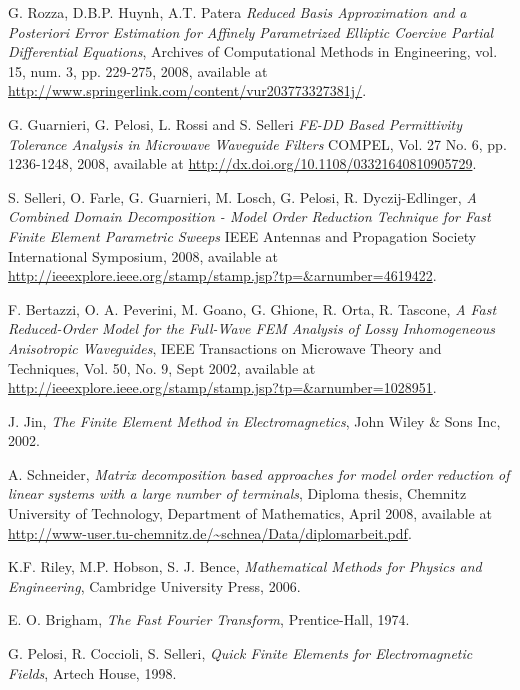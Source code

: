 \begin{thebibliography}{99}
 G. Rozza, D.B.P. Huynh, A.T. Patera \emph{ Reduced Basis Approximation and a Posteriori Error Estimation for Affinely Parametrized Elliptic Coercive Partial Differential Equations}, Archives of Computational Methods in Engineering, vol. 15, num. 3, pp. 229-275, 2008, available at \url{http://www.springerlink.com/content/vur203773327381j/}.

 G. Guarnieri, G. Pelosi, L. Rossi and S. Selleri \emph{FE-DD Based Permittivity Tolerance Analysis in Microwave Waveguide Filters} COMPEL, Vol. 27 No. 6, pp. 1236-1248, 2008, available at \url{http://dx.doi.org/10.1108/03321640810905729}.

 S. Selleri, O. Farle, G. Guarnieri, M. Losch, G. Pelosi,  R. Dyczij-Edlinger, \emph{A Combined Domain Decomposition - Model Order Reduction Technique for Fast Finite Element Parametric Sweeps} IEEE Antennas and Propagation Society International Symposium, 2008, available at \url{http://ieeexplore.ieee.org/stamp/stamp.jsp?tp=&arnumber=4619422}.

 F. Bertazzi, O. A. Peverini, M. Goano, G. Ghione, R. Orta, R. Tascone, \emph{A Fast Reduced-Order Model for the Full-Wave FEM Analysis of Lossy Inhomogeneous Anisotropic Waveguides}, IEEE Transactions on Microwave Theory and Techniques, Vol. 50, No. 9, Sept 2002, available at \url{http://ieeexplore.ieee.org/stamp/stamp.jsp?tp=&arnumber=1028951}.


 J. Jin, \emph{The Finite Element Method in Electromagnetics}, John Wiley \& Sons Inc, 2002.

 A. Schneider, \emph{Matrix decomposition based approaches for model order reduction of linear systems with a large number of terminals}, Diploma thesis, Chemnitz University of Technology, Department of Mathematics, April 2008, available at \url{http://www-user.tu-chemnitz.de/~schnea/Data/diplomarbeit.pdf}.

 K.F. Riley, M.P. Hobson, S. J. Bence, \emph{Mathematical Methods for Physics and Engineering}, Cambridge University Press, 2006.

 E. O. Brigham, \emph{The Fast Fourier Transform}, Prentice-Hall, 1974.

 G. Pelosi, R. Coccioli, S. Selleri, \emph{Quick Finite Elements for Electromagnetic Fields}, Artech House, 1998.


\end{thebibliography}
